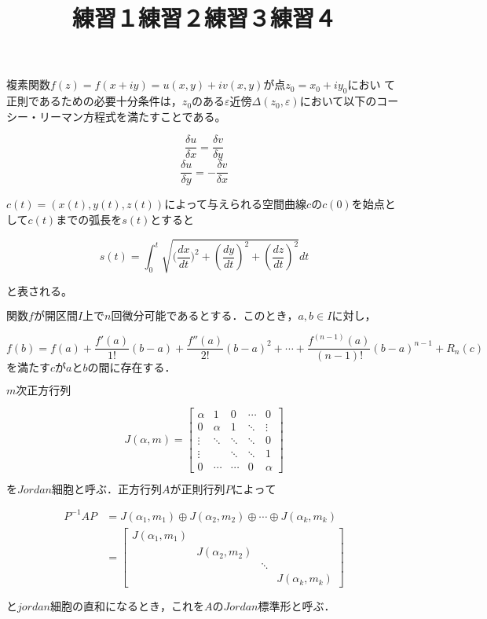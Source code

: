 \documentclass[a4]{jsarticle}
\begin{document}
\title{練習１}

複素関数$f(z)=f(x+iy)=u(x,y)+iv(x,y)$が点$z_0=x_0+iy_0$におい
て正則であるための必要十分条件は，$z_0$のある$ε$近傍$Δ(z_0,ε)$において以下のコーシー・リーマン方程式を満たすことである。

\[\frac{\delta u}{\delta x}=\frac{\delta v}{\delta y}\]
\[\frac{\delta u}{\delta y}=-\frac{\delta v}{\delta x}\]


\title{練習２}
$c(t)=(x(t),y(t),z(t))$によって与えられる空間曲線$c$の$c(0)$を始点として$c(t)$までの弧長を$s(t)$とすると

\[s(t)=\int_{0}^{t} \sqrt{\Big(\frac{dx}{dt}\Big)^2 + (\frac{dy}{dt})^2 + (\frac{dz}{dt})^2} dt\]

と表される。


\title{練習３}
$関数fが開区間I上でn回微分可能であるとする．このとき，a,b \in Iに対し，$

\[f(b)=f(a)+\frac{f'(a)}{1!}(b-a)+\frac{f''(a)}{2!}(b-a)^2+\cdots +\frac{f^{(n-1)}(a)}{(n-1)!}(b-a)^{n-1} +R_n (c)\]
$を満たすcがaとbの間に存在する．$


\title{練習４}
$m次正方行列$

\[J(\alpha　,m)= \left[\begin{array}{rrrrr}
  \alpha & 1 & 0 & \cdots & 0 \\
  0 & \alpha & 1 & \ddots & \vdots \\
  \vdots & \ddots & \ddots & \ddots & 0 \\
  \vdots &  & \ddots & \ddots & 1 \\
  0 & \cdots & \cdots & 0 & \alpha
\end{array}\right]
\]

$をJordan細胞と呼ぶ．正方行列Aが正則行列Pによって$

\begin{align}
  P^{-1}AP &= J(\alpha_1,m_1)\oplus J(\alpha_2,m_2)\oplus\cdots\oplus J(\alpha_k,m_k)\\
  &=\left[\begin{array}{rrrr}
    J(\alpha_1,m_1) & & & \\
    & J(\alpha_2,m_2) & & \\
    & & \ddots & \\
    & & & J(\alpha_k,m_k)
  \end{array}\right]
\end{align}

$とjordan細胞の直和になるとき，これをAのJordan標準形と呼ぶ．$
\end{document}
